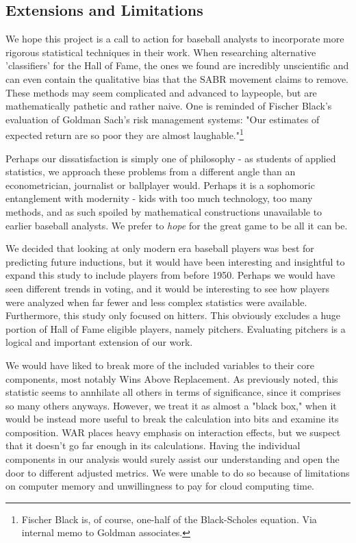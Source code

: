 \documentclass[letterpaper, 10 pt, conference]{ieeeconf}
\begin{document}
\subsection{Extensions and Limitations}
We hope this project is a call to action for baseball analysts to incorporate more rigorous statistical techniques in their work. When researching alternative 'classifiers' for the Hall of Fame, the ones we found are incredibly unscientific and can even contain the qualitative bias that the SABR movement claims to remove. These methods may seem complicated and advanced to laypeople, but are mathematically pathetic and rather naive. One is reminded of Fischer Black's evaluation of Goldman Sach's risk management systems: "Our estimates of expected return are so poor they are almost laughable."\footnote{Fischer Black is, of course, one-half of the Black-Scholes equation. Via internal memo to Goldman associates.} 

Perhaps our dissatisfaction is simply one of philosophy - as students of applied statistics, we approach these problems from a different angle than an econometrician, journalist or ballplayer would. Perhaps it is a sophomoric entanglement with modernity - kids with too much technology, too many methods, and as such spoiled by mathematical constructions unavailable to earlier baseball analysts. We prefer to \textit{hope} for the great game to be all it can be.

We decided that looking at only modern era baseball players was best for predicting future inductions, but it would have been interesting and insightful to expand this study to include players from before 1950. Perhaps we would have seen different trends in voting, and it would be interesting to see how players were analyzed when far fewer and less complex statistics were available. Furthermore, this study only focused on hitters. This obviously excludes a huge portion of Hall of Fame eligible players, namely pitchers. Evaluating pitchers is a logical and important extension of our work. 

We would have liked to break more of the included variables to their core components, most notably Wins Above Replacement. As previously noted, this statistic seems to annhilate all others in terms of significance, since it comprises so many others anyways. However, we treat it as almost a "black box," when it would be instead more useful to break the calculation into bits and examine its composition. WAR places heavy emphasis on interaction effects, but we suspect that it doesn't go far enough in its calculations. Having the individual components in our analysis would surely assist our understanding and open the door to different adjusted metrics. We were unable to do so because of limitations on computer memory and unwillingness to pay for cloud computing time.
\end{document}
